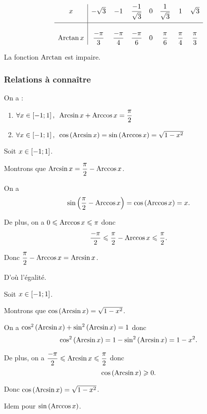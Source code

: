 \begin{ex}
\[\begin{array}{c|ccccccc}
x & -\sqrt{3} & -1 & \dfrac{-1}{\sqrt{3}} & 0 & \dfrac{1}{\sqrt{3}} & 1 & \sqrt{3} \\[1em]
\hline \\
\operatorname{Arctan} x & \dfrac{-\pi}{3} & \dfrac{-\pi}{4} & \dfrac{-\pi}{6} & 0 & \dfrac{\pi}{6} & \dfrac{\pi}{4} & \dfrac{\pi}{3}
\end{array}\]
\end{ex}

\begin{prop}
La fonction \(\operatorname{Arctan}\) est impaire.
\end{prop}

\subsubsection{Relations à connaître}

\begin{prop}
On a :

\begin{enumerate}
\item \(\quantifs{\forall x\in\intervii{-1}{1}}\Arcsin x+\Arccos x=\dfrac{\pi}{2}\) \\

\item \(\quantifs{\forall x\in\intervii{-1}{1}}\cos\paren{\Arcsin x}=\sin\paren{\Arccos x}=\sqrt{1-x^2}\)
\end{enumerate}
\end{prop}

\begin{dem}[1]
Soit \(x\in\left[-1;1\right]\).

Montrons que \(\operatorname{Arcsin} x=\dfrac{\pi}{2}-\operatorname{Arccos} x\).

On a \[\sin\left(\dfrac{\pi}{2}-\operatorname{Arccos} x\right)=\cos\left(\operatorname{Arccos} x\right)=x.\]

De plus, on a \(0\leqslant\operatorname{Arccos} x\leqslant\pi\) donc \[\dfrac{-\pi}{2}\leqslant\dfrac{\pi}{2}-\operatorname{Arccos} x\leqslant\dfrac{\pi}{2}.\]

Donc \(\dfrac{\pi}{2}-\operatorname{Arccos} x=\operatorname{Arcsin} x\).

D'où l'égalité.
\end{dem}

\begin{dem}[2]
Soit \(x\in\left[-1;1\right]\).

Montrons que \(\cos\left(\operatorname{Arcsin} x\right)=\sqrt{1-x^2}\).

On a \(\cos^2\left(\operatorname{Arcsin} x\right)+\sin^2\left(\operatorname{Arcsin} x\right)=1\) donc \[\cos^2\left(\operatorname{Arcsin} x\right)=1-\sin^2\left(\operatorname{Arcsin} x\right)=1-x^2.\]

De plus, on a \(\dfrac{-\pi}{2}\leqslant\operatorname{Arcsin} x\leqslant\dfrac{\pi}{2}\) donc \[\cos\left(\operatorname{Arcsin} x\right)\geqslant0.\]

Donc \(\cos\left(\operatorname{Arcsin} x\right)=\sqrt{1-x^2}\).

Idem pour \(\sin\left(\operatorname{Arccos} x\right)\).
\end{dem}

